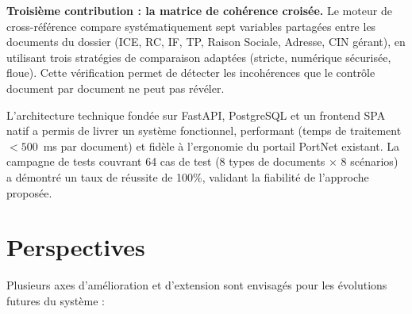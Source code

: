 \textbf{Troisi\`{e}me contribution : la matrice de coh\'{e}rence crois\'{e}e.} Le moteur de cross-r\'{e}f\'{e}rence compare syst\'{e}matiquement sept variables partag\'{e}es entre les documents du dossier (ICE, RC, IF, TP, Raison Sociale, Adresse, CIN g\'{e}rant), en utilisant trois strat\'{e}gies de comparaison adapt\'{e}es (stricte, num\'{e}rique s\'{e}curis\'{e}e, floue). Cette v\'{e}rification permet de d\'{e}tecter les incoh\'{e}rences que le contr\^{o}le document par document ne peut pas r\'{e}v\'{e}ler.

L'architecture technique fond\'{e}e sur FastAPI, PostgreSQL et un frontend SPA natif a permis de livrer un syst\`{e}me fonctionnel, performant (temps de traitement $<500$~ms par document) et fid\`{e}le \`{a} l'ergonomie du portail PortNet existant. La campagne de tests couvrant 64 cas de test (8 types de documents $\times$ 8 sc\'{e}narios) a d\'{e}montr\'{e} un taux de r\'{e}ussite de 100\%, validant la fiabilit\'{e} de l'approche propos\'{e}e.

\section*{Perspectives}

Plusieurs axes d'am\'{e}lioration et d'extension sont envisag\'{e}s pour les \'{e}volutions futures du syst\`{e}me :

